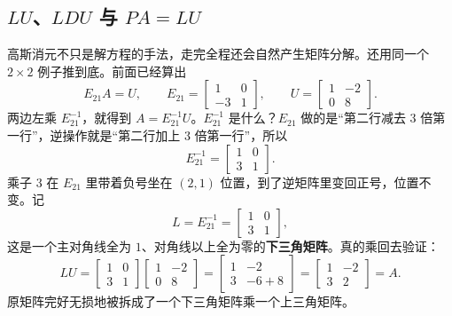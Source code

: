 \documentclass[UTF8,a4paper,12pt]{ctexart}
\numberwithin{equation}{section}
\begin{document}
	\subsection{\texorpdfstring{$LU$、$LDU$ 与 $PA=LU$}{LU、LDU 与 PA=LU}}
	
	高斯消元不只是解方程的手法，走完全程还会自然产生矩阵分解。还用同一个 $2\times 2$ 例子推到底。前面已经算出
	\begin{equation}\label{eq:4.55}
	E_{21}A=U,
	\qquad
	E_{21}=
	\begin{bmatrix}
		1&0\\
		-3&1
	\end{bmatrix},
	\qquad
	U=
	\begin{bmatrix}
		1&-2\\
		0&8
	\end{bmatrix}.
	\end{equation}
	两边左乘 $E_{21}^{-1}$，就得到 $A=E_{21}^{-1}U$。$E_{21}^{-1}$ 是什么？$E_{21}$ 做的是“第二行减去 $3$ 倍第一行”，逆操作就是“第二行加上 $3$ 倍第一行”，所以
	\begin{equation}\label{eq:4.56}
	E_{21}^{-1}=
	\begin{bmatrix}
		1&0\\
		3&1
	\end{bmatrix}.
	\end{equation}
	乘子 $3$ 在 $E_{21}$ 里带着负号坐在 $(2,1)$ 位置，到了逆矩阵里变回正号，位置不变。记
	\begin{equation}\label{eq:4.57}
	L=E_{21}^{-1}=
	\begin{bmatrix}
		1&0\\
		3&1
	\end{bmatrix},
	\end{equation}
	这是一个主对角线全为 $1$、对角线以上全为零的\textbf{下三角矩阵}。真的乘回去验证：
	\begin{equation}\label{eq:4.58}
	LU
	=
	\begin{bmatrix}
		1&0\\
		3&1
	\end{bmatrix}
	\begin{bmatrix}
		1&-2\\
		0&8
	\end{bmatrix}
	=
	\begin{bmatrix}
		1&-2\\
		3&-6+8
	\end{bmatrix}
	=
	\begin{bmatrix}
		1&-2\\
		3&2
	\end{bmatrix}
	=A.
	\end{equation}
	原矩阵完好无损地被拆成了一个下三角矩阵乘一个上三角矩阵。
	
\end{document}
